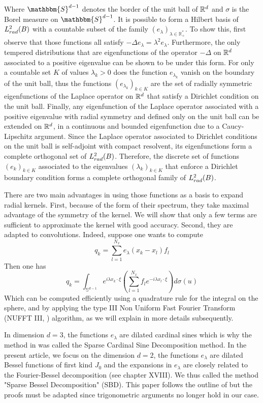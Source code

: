 \documentclass[11pt,a4paper]{article}
\begin{document}
Where $\mathbbm{S}^{d-1}$ denotes the border of the unit ball of $\mathbb{R}^d$ and $\sigma$ is the Borel measure on $\mathbbm{S}^{d-1}$. It is possible to form a Hilbert basis of $L^2_{rad}(B)$ with a countable subset of the family $(e_\lambda)_{\lambda \in \mathbb{R}^*_+}$. To show this, first observe that those functions all satisfy $-\Delta e_\lambda = \lambda^2 e_\lambda$. Furthermore, the only tempered distributions that are eigenfunctions of the operator $-\Delta$ on $\mathbb{R}^d$ associated to a positive eigenvalue can be shown to be under this form. For only a countable set $K$ of values $\lambda_k > 0$ does the function $e_{\lambda_k}$ vanish on the boundary of the unit ball, thus the functions $(e_{\lambda_k})_{k \in K}$ are the set of radially symmetric eigenfunctions of the Laplace operator on $\mathbb{R}^d$ that satisfy a Dirichlet condition on the unit ball. Finally, any eigenfunction of the Laplace operator associated with a positive eigenvalue with radial symmetry and defined only on the unit ball can be extended on $\mathbb{R}^d$, in a continuous and bounded eigenfunction due to a Caucy-Lipschitz argument. Since the Laplace operator associated to Dirichlet conditions on the unit ball is self-adjoint with compact resolvent, its eigenfunctions form a complete orthogonal set of $L^2_{rad}(B)$. Therefore, the discrete set of functions $(e_k)_{k\in K}$ associated to the eigenvalues $(\lambda_k)_{k\in K}$ that enforce a Dirichlet boundary condition forms a complete orthogonal family of $L^2_{rad}(B)$. 

There are two main advantages in using those functions as a basis to expand radial kernels. First, because of the form of their spectrum, they take maximal advantage of the symmetry of the kernel. We will show that only a few terms are sufficient to approximate the kernel with good accuracy. Second, they are adapted to convolutions. Indeed, suppose one wants to compute 
\[ q_k = \sum_{l=1}^{N_x} e_\lambda(x_k - x_l)f_l \]
Then one has 
\[ q_k = \int_{\mathbb{S}^{d-1}} e^{i\lambda x_k \cdot  \xi} \left(\sum_{{l=1}}^{N_x}  f_l e^{-i\lambda x_l \cdot \xi}\right)d\sigma(u)\]
Which can be computed efficiently using a quadrature rule for the integral on the sphere, and by applying the type III Non Uniform Fast Fourier Transform (NUFFT III, \cite{NuFFT}) algorithm, as we will explain in more details subsequently. 

In dimension $d=3$, the functions $e_\lambda$ are dilated cardinal sines which is why the method in \cite{Alouges2015} was called the Sparse Cardinal Sine Decomposition method. In the present article, we focus on the dimension $d=2$, the functions $e_\lambda$ are dilated Bessel functions of first kind $J_0$ and the expansions in $e_{\lambda}$ are closely related to the Fourier-Bessel decomposition (see \cite{watson1995treatise} chapter XVIII). We thus called the method "Sparse Bessel Decomposition" (SBD). This paper follows the outline of \cite{Alouges2015} but the proofs must be adapted since trigonometric arguments no longer hold in our case. 
\end{document}
